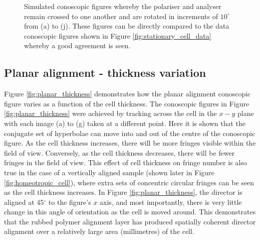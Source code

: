 \begin{figure}
\begin{center}
\end{center}
\caption[Simulated conoscopic images of a planar cell - rotating polarisers]{\label{fig:stationary_cell_model}Simulated conoscopic figures whereby the polariser and analyser remain crossed to one another and are rotated in increments of $10^\circ$ from (a) to (j). These figures can be directly compared to the data conoscopic figures shown in Figure \ref{fig:stationary_cell_data} whereby a good agreement is seen.}
\end{figure}

\subsection{Planar alignment - thickness variation}
Figure \ref{fig:planar_thickness} demonstrates how the planar alignment conoscopic figure varies as a function of the cell thickness. The conoscopic figures in Figure \ref{fig:planar_thickness} were achieved by tracking across the cell in the $x-y$ plane with each image (a) to (g) taken at a different point. Here it is shown that the conjugate set of hyperbolae can move into and out of the centre of the conoscopic figure. As the cell thickness increases, there will be more fringes visible within the field of view. Conversely, as the cell thickness decreases, there will be fewer fringes in the field of view. This effect of cell thickness on fringe number is also true in the case of a vertically aligned sample (shown later in Figure \ref{fig:homeotropic_cell}), where extra sets of concentric circular fringes can be seen as the cell thickness increases. In Figure \ref{fig:planar_thickness}, the director is aligned at 45$^\circ$ to the figure's $x$ axis, and most importantly, there is very little change in this angle of orientation as the cell is moved around. This demonstrates that the rubbed polymer alignment layer has produced spatially coherent director alignment over a relatively large area (millimetres) of the cell. 


